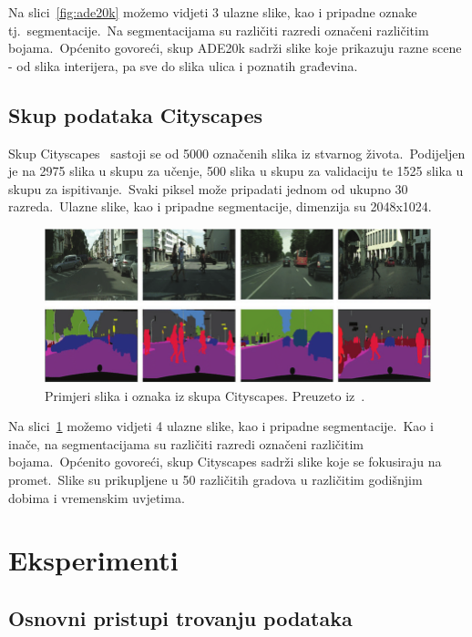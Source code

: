 \documentclass[times, utf8, seminar, numeric]{fer}
\begin{document}
Na slici~\ref{fig:ade20k} možemo vidjeti 3 ulazne slike, kao i pripadne oznake tj.\ segmentacije.\ 
Na segmentacijama su različiti razredi označeni različitim bojama.\ 
Općenito govoreći, skup ADE20k sadrži slike koje prikazuju razne scene - od slika interijera, pa sve do slika ulica i poznatih građevina.\ 

\section{Skup podataka Cityscapes}

Skup Cityscapes~\cite{cordts2016cityscapes} sastoji se od 5000 označenih slika iz stvarnog života.\ 
Podijeljen je na 2975 slika u skupu za učenje, 500 slika u skupu za validaciju te 1525 slika u skupu za ispitivanje.\ Svaki piksel može pripadati jednom od ukupno 30 razreda.\ 
Ulazne slike, kao i pripadne segmentacije, dimenzija su 2048x1024.\ 

\begin{figure}[htb]
    \centering
    \includegraphics[scale=0.45]{./Slike/cityscapes.png}
    \caption{Primjeri slika i oznaka iz skupa Cityscapes. Preuzeto iz~\cite{rafique2022cnn}.}
    \label{fig:cityscapes}
\end{figure}

Na slici~\ref{fig:cityscapes} možemo vidjeti 4 ulazne slike, kao i pripadne segmentacije.\ 
Kao i inače, na segmentacijama su različiti razredi označeni različitim bojama.\ 
Općenito govoreći, skup Cityscapes sadrži slike koje se fokusiraju na promet.\ 
Slike su prikupljene u 50 različitih gradova u različitim godišnjim dobima i vremenskim uvjetima.\ 

\chapter{Eksperimenti}

\section{Osnovni pristupi trovanju podataka}
\end{document}
